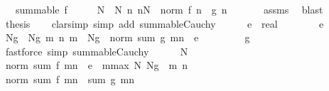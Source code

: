 \begin{isabellebody}
\ \ \ {\isachardoublequoteopen}summable\ f{\isachardoublequoteclose}\isanewline
%
\isadelimproof
%
\endisadelimproof
%
\isatagproof
{}\isamarkupfalse%
\ {\isacharminus}{\kern0pt}\isanewline
\ \ \isamarkupfalse%
\ N\ \ N{\isacharcolon}{\kern0pt}\ {\isachardoublequoteopen}{\isasymAnd}n{\isachardot}{\kern0pt}\ n{\isasymge}N\ {\isasymLongrightarrow}\ norm\ {\isacharparenleft}{\kern0pt}f\ n{\isacharparenright}{\kern0pt}\ {\isasymle}\ g\ n{\isachardoublequoteclose}\ \isanewline
\ \ \ \ \isamarkupfalse%
\ assms\ \isamarkupfalse%
\ blast\isanewline
\ \ \isamarkupfalse%
\ {\isacharquery}{\kern0pt}thesis\isanewline
\ \ \isamarkupfalse%
\ {\isacharparenleft}{\kern0pt}clarsimp\ simp\ add{\isacharcolon}{\kern0pt}\ summable{\isacharunderscore}{\kern0pt}Cauchy{\isacharparenright}{\kern0pt}\isanewline
\ \ \ \ \isamarkupfalse%
\ e\ {\isacharcolon}{\kern0pt}{\isacharcolon}{\kern0pt}\ real\isanewline
\ \ \ \ \isamarkupfalse%
\ {\isachardoublequoteopen}{}\ {\isacharless}{\kern0pt}\ e{\isachardoublequoteclose}\isanewline
\ \ \ \ \isamarkupfalse%
\ \isamarkupfalse%
\ Ng\ \ Ng{\isacharcolon}{\kern0pt}\ {\isachardoublequoteopen}{\isasymAnd}m\ n{\isachardot}{\kern0pt}\ m\ {\isasymge}\ Ng\ {\isasymLongrightarrow}\ norm\ {\isacharparenleft}{\kern0pt}sum\ g\ {\isacharbraceleft}{\kern0pt}m{\isachardot}{\kern0pt}{\isachardot}{\kern0pt}{\isacharless}{\kern0pt}n{\isacharbraceright}{\kern0pt}{\isacharparenright}{\kern0pt}\ {\isacharless}{\kern0pt}\ e{\isachardoublequoteclose}\ \isanewline
\ \ \ \ \ \ \isamarkupfalse%
\ g\ \isamarkupfalse%
\ {\isacharparenleft}{\kern0pt}fastforce\ simp{\isacharcolon}{\kern0pt}\ summable{\isacharunderscore}{\kern0pt}Cauchy{\isacharparenright}{\kern0pt}\isanewline
\ \ \ \ \isamarkupfalse%
\ N\ \isamarkupfalse%
\ {\isachardoublequoteopen}norm\ {\isacharparenleft}{\kern0pt}sum\ f\ {\isacharbraceleft}{\kern0pt}m{\isachardot}{\kern0pt}{\isachardot}{\kern0pt}{\isacharless}{\kern0pt}n{\isacharbraceright}{\kern0pt}{\isacharparenright}{\kern0pt}\ {\isacharless}{\kern0pt}\ e{\isachardoublequoteclose}\ \ {\isachardoublequoteopen}m{\isasymge}max\ N\ Ng{\isachardoublequoteclose}\ \ m\ n\isanewline
\ \ \ \ \isamarkupfalse%
\ {\isacharminus}{\kern0pt}\isanewline
\ \ \ \ \ \ \isamarkupfalse%
\ {\isachardoublequoteopen}norm\ {\isacharparenleft}{\kern0pt}sum\ f\ {\isacharbraceleft}{\kern0pt}m{\isachardot}{\kern0pt}{\isachardot}{\kern0pt}{\isacharless}{\kern0pt}n{\isacharbraceright}{\kern0pt}{\isacharparenright}{\kern0pt}\ {\isasymle}\ sum\ g\ {\isacharbraceleft}{\kern0pt}m{\isachardot}{\kern0pt}{\isachardot}{\kern0pt}{\isacharless}{\kern0pt}n{\isacharbraceright}{\kern0pt}{\isachardoublequoteclose}\isanewline

\end{isabellebody}
